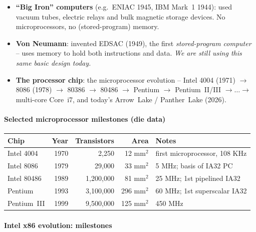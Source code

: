 \begin{itemize}
  \item \textbf{``Big Iron'' computers} (e.g.\ ENIAC 1945, IBM Mark~1 1944):
  used vacuum tubes, electric relays and bulk magnetic storage devices. No
  microprocessors, no (stored-program) memory.
  \item \textbf{Von Neumann}: invented EDSAC (1949), the first
  \emph{stored-program computer} -- uses memory to hold both instructions
  and data. \emph{We are still using this same basic design today.}
  \item \textbf{The processor chip}: the microprocessor evolution --
  Intel 4004 (1971) $\to$ 8086 (1978) $\to$ 80386 $\to$ 80486 $\to$
  Pentium $\to$ Pentium~II/III $\to \dots \to$ multi-core Core~i7, and
  today's Arrow~Lake / Panther~Lake (2026).
\end{itemize}

\paragraph{Selected microprocessor milestones (die data)}

\begin{center}
\begin{tabular}{@{}lrrrl@{}}
\toprule
Chip & Year & Transistors & Area & Notes \\
\midrule
Intel 4004      & 1970 & 2,250      & 12 mm$^2$  & first microprocessor, 108 KHz \\
Intel 8086      & 1979 & 29,000     & 33 mm$^2$  & 5 MHz; basis of IA32 PC \\
Intel 80486     & 1989 & 1,200,000  & 81 mm$^2$  & 25 MHz; 1st pipelined IA32 \\
Pentium         & 1993 & 3,100,000  & 296 mm$^2$ & 60 MHz; 1st superscalar IA32 \\
Pentium~III     & 1999 & 9,500,000  & 125 mm$^2$ & 450 MHz \\
\bottomrule
\end{tabular}
\end{center}

\paragraph{Intel x86 evolution: milestones}

